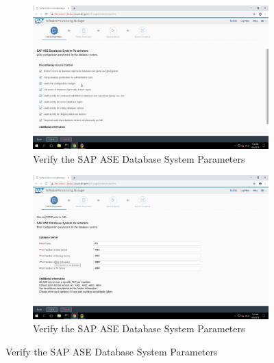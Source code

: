 \begin{figure}[!htb]
    \begin{subfigure}{0.5\textwidth}
        \captionsetup{width=0.8\linewidth}
        \includegraphics[width=0.9\linewidth]{img/Methodologie/SAP20.png}
        \centering
        \caption{Verify the SAP ASE Database System Parameters}
    \end{subfigure}
    \begin{subfigure}{0.5\textwidth}
        \captionsetup{width=0.8\linewidth}
        \includegraphics[width=0.9\linewidth]{img/Methodologie/SAP19.png} 
        \centering
        \caption{Verify the SAP ASE Database System Parameters}
    \end{subfigure}
\end{figure}
